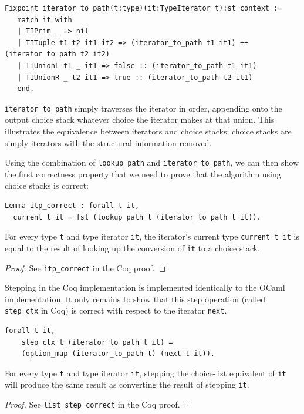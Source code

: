 \documentclass[a4paper,english]{lipics-v2019}
\begin{document}
\begin{small}\begin{verbatim}
Fixpoint iterator_to_path(t:type)(it:TypeIterator t):st_context :=
   match it with
   | TIPrim _ => nil
   | TITuple t1 t2 it1 it2 => (iterator_to_path t1 it1) ++ (iterator_to_path t2 it2)
   | TIUnionL t1 _ it1 => false :: (iterator_to_path t1 it1)
   | TIUnionR _ t2 it1 => true :: (iterator_to_path t2 it1)
   end.
\end{verbatim}\end{small}

\verb|iterator_to_path| simply traverses the iterator in order, appending onto the
output choice stack whatever choice the iterator makes at that union. This illustrates
the equivalence between iterators and choice stacks; choice stacks are simply iterators
with the structural information removed.

Using the combination of \verb|lookup_path| and \verb|iterator_to_path|, we
can then show the first correctness property that we need to prove that the
algorithm using choice stacks is correct:

\begin{lemma}
\begin{small}\begin{verbatim}
Lemma itp_correct : forall t it, 
  current t it = fst (lookup_path t (iterator_to_path t it)).
\end{verbatim}\end{small}

For every type \verb|t| and type iterator \verb|it|, the iterator's current type \verb|current t it| is equal
to the result of looking up the conversion of \verb|it| to a choice stack.
\end{lemma}
\begin{proof}
See \verb|itp_correct| in the Coq proof.
\end{proof}

Stepping in the Coq implementation is implemented identically to the OCaml
implementation. It only remains to show that this step operation (called
\verb|step_ctx| in Coq) is correct with respect to the iterator
\verb|next|.

\begin{lemma}
\begin{small}\begin{verbatim}
forall t it,
    step_ctx t (iterator_to_path t it) =
    (option_map (iterator_to_path t) (next t it)).
\end{verbatim}\end{small}
For every type \verb|t| and type iterator \verb|it|,
stepping the choice-list equivalent of \verb|it| will
produce the same result as converting the result of stepping
\verb|it|.
\end{lemma}
\begin{proof}
See \verb|list_step_correct| in the Coq proof.
\end{proof}
\end{document}
